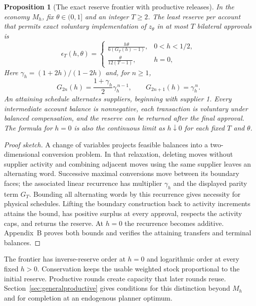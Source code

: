 \documentclass[ecta,draft]{econsocart}
\newtheorem{proposition}[theorem]{Proposition}
\theoremstyle{definition}
\theoremstyle{definition}
\begin{document}
\begin{proposition}[The exact reserve frontier with productive releases]
\label{prop:exactproductive}
In the economy $M_h$, fix $\theta\in(0,1]$ and an integer $T\geq2$.
The least reserve per account that permits exact voluntary implementation
of $z_\theta$ in at most $T$ bilateral approvals is
\begin{equation}
 \epsilon_T(h,\theta)=
 \begin{cases}
 \displaystyle\frac{h\theta}{6(G_T(h)-1)},&0<h<1/2,\\[6pt]
 \displaystyle\frac{\theta}{12(T-1)},&h=0,
 \end{cases}
 \label{eq:exactproductiveseed}
\end{equation}
Here $\gamma_h=(1+2h)/(1-2h)$ and, for $n\geq1$,
\[
 G_{2n}(h)=\frac{1+\gamma_h}{2}\gamma_h^{\,n-1},
 \qquad G_{2n+1}(h)=\gamma_h^{\,n}.
\]
An attaining schedule alternates suppliers, beginning with supplier 1.
Every intermediate account balance is nonnegative, each transaction is
voluntary under balanced compensation, and the reserve can be returned
after the final approval. The formula for $h=0$ is also the continuous
limit as $h\downarrow0$ for each fixed $T$ and $\theta$.
\end{proposition}

\begin{proof}[Proof sketch]
A change of variables projects feasible balances into a two-dimensional
conversion problem. In that relaxation, deleting moves without supplier
activity and combining adjacent moves using the same supplier leaves an
alternating word. Successive maximal conversions move between its boundary
faces; the associated linear recurrence
has multiplier $\gamma_h$ and the displayed parity term $G_T$. Bounding all
alternating words by this recurrence gives necessity for physical schedules.
Lifting the boundary construction back to activity increments attains the bound,
has positive surplus at every approval,
respects the activity caps, and returns the reserve. At $h=0$ the recurrence
becomes additive. Appendix~B%
 proves both bounds and
verifies the attaining transfers and terminal balances.
\end{proof}

The frontier has inverse-reserve order at $h=0$ and logarithmic order at every
fixed $h>0$. Conservation keeps the usable weighted
stock proportional to the initial reserve. Productive rounds create capacity
that later rounds reuse. Section~\ref{sec:generalproductive} gives conditions
for this distinction beyond $M_h$ and for completion at an endogenous planner
optimum.
\end{document}
